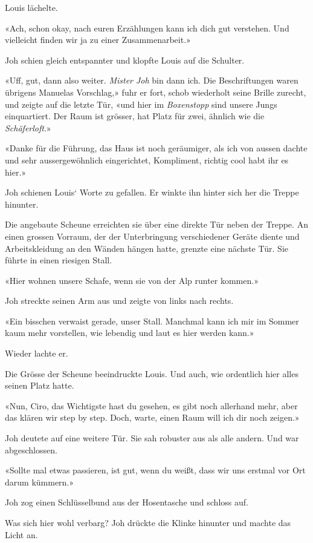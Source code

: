 Louis lächelte.

«Ach, schon okay, nach euren Erzählungen kann ich dich gut verstehen.
Und vielleicht finden wir ja zu einer Zusammenarbeit.»

Joh schien gleich entspannter und klopfte Louis auf die Schulter.

«Uff, gut, dann also weiter. \emph{Mister Joh} bin dann ich. Die
Beschriftungen waren übrigens Manuelas Vorschlag,» fuhr er fort, schob
wiederholt seine Brille zurecht, und zeigte auf die letzte Tür, «und
hier im \emph{Boxenstopp} sind unsere Jungs einquartiert. Der Raum ist
grösser, hat Platz für zwei, ähnlich wie die \emph{Schäferloft}.»

«Danke für die Führung, das Haus ist noch geräumiger, als ich von aussen
dachte und sehr aussergewöhnlich eingerichtet, Kompliment, richtig cool
habt ihr es hier.»

Joh schienen Louis` Worte zu gefallen. Er winkte ihn hinter sich her die
Treppe hinunter.

Die angebaute Scheune erreichten sie über eine direkte Tür neben der
Treppe. An einen grossen Vorraum, der der Unterbringung verschiedener
Geräte diente und Arbeitskleidung an den Wänden hängen hatte, grenzte
eine nächste Tür. Sie führte in einen riesigen Stall.

«Hier wohnen unsere Schafe, wenn sie von der Alp runter kommen.»

Joh streckte seinen Arm aus und zeigte von links nach rechts.

«Ein bisschen verwaist gerade, unser Stall. Manchmal kann ich mir im
Sommer kaum mehr vorstellen, wie lebendig und laut es hier werden kann.»

Wieder lachte er.

Die Grösse der Scheune beeindruckte Louis. Und auch, wie ordentlich hier
alles seinen Platz hatte.

«Nun, Ciro, das Wichtigste hast du gesehen, es gibt noch allerhand mehr,
aber das klären wir step by step. Doch, warte, einen Raum will ich dir
noch zeigen.»

Joh deutete auf eine weitere Tür. Sie sah robuster aus als alle andern.
Und war abgeschlossen.

«Sollte mal etwas passieren, ist gut, wenn du weißt, dass wir uns
erstmal vor Ort darum kümmern.»

Joh zog einen Schlüsselbund aus der Hosentasche und schloss auf.

Was sich hier wohl verbarg? Joh drückte die Klinke hinunter und machte
das Licht an.

